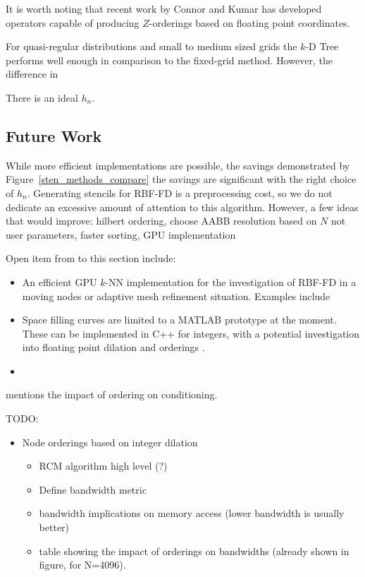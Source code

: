 \documentclass{report}
\begin{document}
It is worth noting that recent work by Connor and Kumar \cite{Connor2009} has developed operators capable of producing $Z$-orderings based on floating point coordinates. 

For quasi-regular distributions and small to medium sized grids the $k$-D Tree performs well enough in comparison to the fixed-grid method. However, the difference in 

There is an ideal $h_n$. %



\subsection{Future Work}

While more efficient implementations are possible, the savings demonstrated by Figure~\ref{sten_methods_compare} the savings are significant with the right choice of $h_n$. Generating stencils for RBF-FD is a preprocessing cost, so we do not dedicate an excessive amount of attention to this algorithm. However, a few ideas that would improve: hilbert ordering, choose AABB resolution based on $N$ not user parameters, faster sorting, GPU implementation

Open item from to this section include: 
\begin{itemize} 
\item An efficient GPU $k$-NN implementation for the investigation of RBF-FD in a moving nodes or adaptive mesh refinement situation. Examples include \cite{Pan2011, Goswami2010, Connor2009}
\item Space filling curves are limited to a MATLAB prototype at the moment. These can be implemented in C++ for integers, with a potential investigation into floating point dilation and orderings \cite{Connor2009}.
\item 
\end{itemize}

\cite{Saad2003} mentions the impact of ordering on conditioning.


TODO: 
\begin{itemize} 
\item Node orderings based on integer dilation
\begin{itemize} 
\item RCM algorithm high level (?)
\item Define bandwidth metric
\item bandwidth implications on memory access (lower bandwidth is usually better)
\item table showing the impact of orderings on bandwidths (already shown in figure, for N=4096). 
\end{itemize} 
\end{itemize}


\ifstandalone


\end{document}
